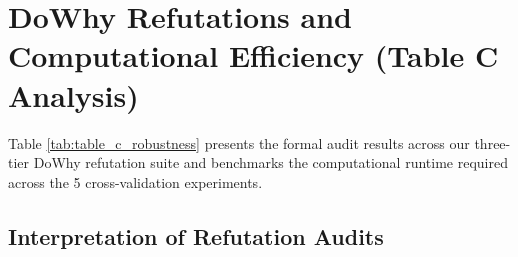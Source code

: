 \section{DoWhy Refutations and Computational Efficiency (Table C Analysis)}
\label{sec:exp_refutations}

Table \ref{tab:table_c_robustness} presents the formal audit results across our three-tier DoWhy refutation suite and benchmarks the computational runtime required across the 5 cross-validation experiments.

\begin{table}[htbp]
    \centering
    \small
    \caption{Table C: DoWhy Refutation Audit, Empirical Stability Spread, and Hardware Runtimes.}
    \label{tab:table_c_robustness}
\end{table}

\subsection{Interpretation of Refutation Audits}

